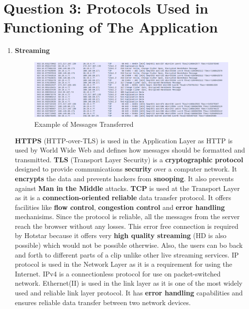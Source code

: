 \documentclass[a4paper,10pt]{article}
\newlength{\strutheight}
\begin{document}
\section*{Question 3: Protocols Used in Functioning of The Application}
\begin{enumerate}
	\item \textbf{\color{Magenta} \large Streaming}\\
	\begin{adjustbox}{valign=T,raise=\strutheight,minipage={\linewidth}}
		\begin{figure}
			\includegraphics[width=15cm]{Images/stream}
			\caption{Example of Messages Transferred}
		\end{figure}
		\strut{}
		\textbf{HTTPS} (HTTP-over-TLS) is used in the Application Layer as HTTP is used by World Wide Web and defines how messages should be formatted and transmitted. \textbf{TLS} (Transport Layer Security) is a \textbf{cryptographic protocol} designed to provide communications \textbf{security} over a computer network. It \textbf{encrypts} the data and prevents hackers from \textbf{snooping}. It also prevents against \textbf{Man in the Middle} attacks. \textbf{TCP} is used at the Transport Layer as it is a \textbf{connection-oriented} \textbf{reliable} data transfer protocol. It offers facilities like \textbf{flow control}, \textbf{congestion control} and \textbf{error handling} mechanisims. Since the protocol is reliable, all the messages from the server reach the browser without any losses. This error free connection is required by Hotstar because it offers very \textbf{high quality streaming} (HD is also possible) which would not be possible otherwise. Also, the users can bo back and forth to different parts of a clip unlike other live streaming services. IP protocol is used in the Network Layer as it is a requirement for using the Internet. IPv4 is a connectionless protocol for use on packet-switched network. Ethernet(II) is used in the link layer as it is one of the most widely used and reliable link layer protocol. It has \textbf{error handling} capabilities and ensures reliable data transfer between two network devices.

\end{adjustbox}
\end{enumerate}
\end{document}
